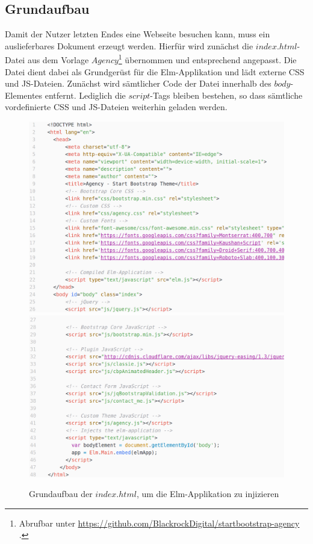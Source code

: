 \subsection{Grundaufbau}
\label{sec:Grundaufbau}
Damit der Nutzer letzten Endes eine Webseite besuchen kann, muss ein auslieferbares Dokument erzeugt werden. Hierfür wird zunächst die $index.html$-Datei aus dem Vorlage $Agency$\footnote{Abrufbar unter \url{https://github.com/BlackrockDigital/startbootstrap-agency} \cite{agency-template}.} übernommen und entsprechend angepasst. Die Datei dient dabei als Grundgerüst für die Elm-Applikation und lädt externe \ac{CSS} und \ac{JS}-Dateien.
Zunächst wird sämtlicher Code der Datei innerhalb des $body$-Elementes entfernt. Lediglich die $script$-Tags bleiben bestehen, so dass sämtliche vordefinierte \ac{CSS} und \ac{JS}-Dateien weiterhin geladen werden.
\begin{figure}[p]
\centering
\includegraphics[scale=0.32]{img/index-grundaufbau-1.png}
\includegraphics[scale=0.32]{img/index-grundaufbau-2.png}
\caption{Grundaufbau der $index.html$, um die Elm-Applikation zu injizieren}\label{fig:index-grundaufbau}
\end{figure}

